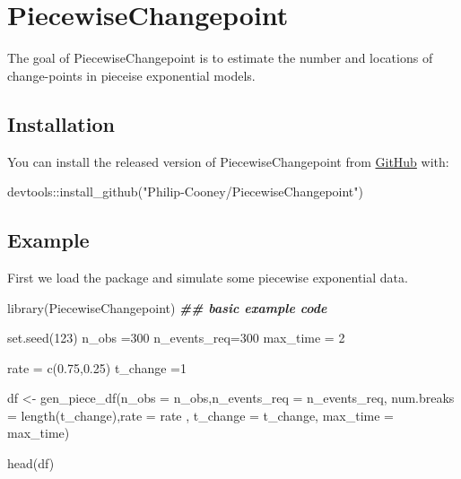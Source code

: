 \documentclass[
]{article}
\author{}
\date{\vspace{-2.5em}}
\newenvironment{Shaded}{\begin{snugshade}}{\end{snugshade}}
\newcommand{\AttributeTok}[1]{\textcolor[rgb]{0.77,0.63,0.00}{#1}}
\newcommand{\DecValTok}[1]{\textcolor[rgb]{0.00,0.00,0.81}{#1}}
\newcommand{\DocumentationTok}[1]{\textcolor[rgb]{0.56,0.35,0.01}{\textbf{\textit{#1}}}}
\newcommand{\FloatTok}[1]{\textcolor[rgb]{0.00,0.00,0.81}{#1}}
\newcommand{\FunctionTok}[1]{\textcolor[rgb]{0.00,0.00,0.00}{#1}}
\newcommand{\NormalTok}[1]{#1}
\newcommand{\OtherTok}[1]{\textcolor[rgb]{0.56,0.35,0.01}{#1}}
\newcommand{\SpecialCharTok}[1]{\textcolor[rgb]{0.00,0.00,0.00}{#1}}
\newcommand{\StringTok}[1]{\textcolor[rgb]{0.31,0.60,0.02}{#1}}
\begin{document}
\hypertarget{piecewisechangepoint}{%
\section{PiecewiseChangepoint}\label{piecewisechangepoint}}

The goal of PiecewiseChangepoint is to estimate the number and locations
of change-points in pieceise exponential models.

\hypertarget{installation}{%
\subsection{Installation}\label{installation}}

You can install the released version of PiecewiseChangepoint from
\href{https://github.com/Philip-Cooney/PiecewiseChangepoint}{GitHub}
with:

\begin{Shaded}
\begin{Highlighting}[]
\NormalTok{devtools}\SpecialCharTok{::}\FunctionTok{install\_github}\NormalTok{(}\StringTok{"Philip{-}Cooney/PiecewiseChangepoint"}\NormalTok{)}
\end{Highlighting}
\end{Shaded}

\hypertarget{example}{%
\subsection{Example}\label{example}}

First we load the package and simulate some piecewise exponential data.

\begin{Shaded}
\begin{Highlighting}[]
\FunctionTok{library}\NormalTok{(PiecewiseChangepoint)}
\DocumentationTok{\#\# basic example code}

\FunctionTok{set.seed}\NormalTok{(}\DecValTok{123}\NormalTok{)}
\NormalTok{n\_obs }\OtherTok{=}\DecValTok{300}
\NormalTok{n\_events\_req}\OtherTok{=}\DecValTok{300}
\NormalTok{max\_time }\OtherTok{=}  \DecValTok{2}

\NormalTok{rate }\OtherTok{=} \FunctionTok{c}\NormalTok{(}\FloatTok{0.75}\NormalTok{,}\FloatTok{0.25}\NormalTok{)}
\NormalTok{t\_change }\OtherTok{=}\DecValTok{1}

\NormalTok{df }\OtherTok{\textless{}{-}} \FunctionTok{gen\_piece\_df}\NormalTok{(}\AttributeTok{n\_obs =}\NormalTok{ n\_obs,}\AttributeTok{n\_events\_req =}\NormalTok{ n\_events\_req,}
                   \AttributeTok{num.breaks =} \FunctionTok{length}\NormalTok{(t\_change),}\AttributeTok{rate =}\NormalTok{ rate ,}
                   \AttributeTok{t\_change =}\NormalTok{ t\_change, }\AttributeTok{max\_time =}\NormalTok{ max\_time)}
                   
\FunctionTok{head}\NormalTok{(df)  }
\end{Highlighting}
\end{Shaded}
\end{document}
